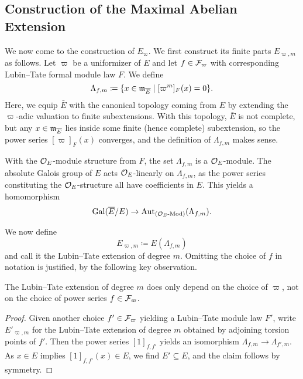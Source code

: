 \documentclass[../main.tex]{subfiles}
\begin{document}
\subsection{Construction of the Maximal Abelian Extension} %
\label{sub:Construction of the Maximal Abelian Extension}
We now come to the construction of $E_\varpi$. We first construct its
finite parts $E_{\varpi, m}$ as follows. Let $\varpi$ be a
uniformizer of $E$ and let $f \in \mathcal{F}_\varpi$ with corresponding
Lubin--Tate formal module law $F$. We define
\begin{equation*}
  \Lambda_{f,m} \coloneqq \{x \in \mathfrak{m}_{\overline E} \mid [\varpi^m]_F(x) = 0\}.
\end{equation*}
Here, we equip $\bar E$ with the canonical topology coming from $E$ by extending the
$\varpi$-adic valuation to finite subextensions. With this topology, $\bar E$
is not complete, but any $x \in \mathfrak{m}_{\overline E}$ lies inside some finite (hence
complete) subextension, so the power series $[\varpi]_F(x)$ converges, and the 
definition of $\Lambda_{f,m}$ makes sense.

With the $\mathcal{O}_E$-module structure from $F$, the set $\Lambda_{f,m}$ is a
$\mathcal{O}_E$-module. The absolute Galois group of $E$ acts $\mathcal{O}_E$-linearly on
$\Lambda_{f,m}$, as the power series constituting the $\mathcal{O}_E$-structure all
have coefficients in $E$. This yields a homomorphism 
\begin{equation} \label{eq:GaloisGroupToLambdaHom}
  \operatorname{Gal}(\overline E /E ) \to \operatorname{Aut}_{{({\mathcal{O}_E}\text-\allowbreak\mathrm{Mod})}}(\Lambda_{f,m}).
\end{equation}

We now define 
\begin{equation*}
  E_{\varpi, m} \coloneq E(\Lambda_{f, m})
\end{equation*}
and call it the Lubin--Tate extension of degree $m$. Omitting the choice of $f$ 
in notation is justified, by the following key observation.
\begin{lem}\label{lem:FiniteLTExtensionIndepOfF}
  The Lubin--Tate extension of degree $m$ does only depend on the choice of $\varpi$,
  not on the choice of power series $f \in \mathcal{F}_\varpi$. 
\begin{proof}
  Given another choice $f' \in \mathcal{F}_\varpi$ yielding a Lubin--Tate module law
  $F'$, write $E'_{\varpi, m}$ for the Lubin--Tate extension of degree $m$ 
  obtained by adjoining torsion points of $f'$. Then the power series 
  $[1]_{f,f'}$ yields an isomorphism $\Lambda_{f,m} \to \Lambda_{f',m}$.
  As $x \in E$ implies $[1]_{f,f'}(x) \in E$, we find $E' \subseteq E$, and the
  claim follows by symmetry.
\end{proof}
\end{lem}
\end{document}
